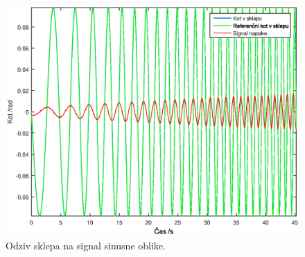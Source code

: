 \begin{figure}
	\centering
	\includegraphics[scale=0.5]{./Slike/follow_sine.eps}
	\caption{Odziv sklepa na signal sinusne oblike.}
	\label{fig:follow_sine}
\end{figure}
